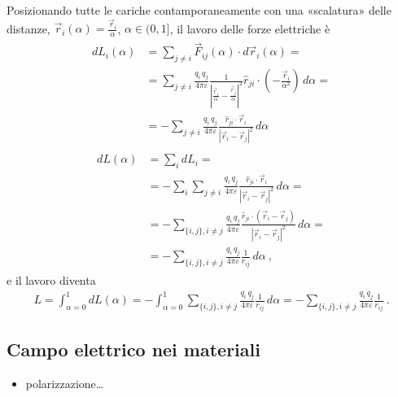 \documentclass[letterpaper,10pt,italian]{jupyterBook}
\begin{document}
\sphinxAtStartPar
Posizionando tutte le cariche contamporaneamente con una «scalatura» delle distanze, \(\vec{r}_i(\alpha) = \frac{\vec{r}_i}{\alpha}\), \(\alpha \in (0, 1]\), il lavoro delle forze elettriche è
\begin{equation*}
\begin{split}\begin{aligned}
  dL_i(\alpha) & = \sum_{j \ne i} \vec{F}_{ij}(\alpha) \cdot d \vec{r}_i(\alpha) = \\
  & = \sum_{j \ne i} \frac{q_i \, q_j}{4 \pi \varepsilon}  \frac{1}{\left| \frac{\vec{r}_i}{\alpha} - \frac{\vec{r}_j}{\alpha}\right|^2} \hat{r}_{ji} \cdot \left(-\frac{\vec{r}_i}{\alpha^2}\right) \, d \alpha = \\
  & = - \sum_{j \ne i} \frac{q_i \, q_j}{4 \pi \varepsilon}  \frac{\hat{r}_{ji} \cdot\vec{r}_i}{\left| \vec{r}_i - \vec{r}_j\right|^2}  \, d \alpha
\end{aligned}\end{split}
\end{equation*}\begin{equation*}
\begin{split}\begin{aligned}
 dL(\alpha) & = \sum_i d L_i = \\
  & = - \sum_{i} \sum_{j \ne i} \frac{q_i \, q_j}{4 \pi \varepsilon}  \frac{\hat{r}_{ji} \cdot\vec{r}_i}{\left| \vec{r}_i - \vec{r}_j\right|^2}  \, d \alpha = \\
  & = - \sum_{\{i,j\}, i \ne j} \frac{q_i \, q_j}{4 \pi \varepsilon}  \frac{\hat{r}_{ji} \cdot \left( \vec{r}_i - \vec{r}_j \right)}{\left| \vec{r}_i - \vec{r}_j\right|^2}  \, d \alpha = \\
  & = - \sum_{\{i,j\}, i \ne j} \frac{q_i \, q_j}{4 \pi \varepsilon}  \frac{1}{r_{ij}}  \, d \alpha  \ ,
\end{aligned}\end{split}
\end{equation*}
\sphinxAtStartPar
e il lavoro diventa
\begin{equation*}
\begin{split}
 L = \int_{\alpha = 0}^{1} dL (\alpha) =  - \int_{\alpha=0}^{1} \sum_{\{i,j\}, i \ne j} \frac{q_i \, q_j}{4 \pi \varepsilon}  \frac{1}{r_{ij}}  \, d \alpha = - \sum_{\{i,j\}, i \ne j} \frac{q_i \, q_j}{4 \pi \varepsilon}  \frac{1}{r_{ij}} \ .
\end{split}
\end{equation*}

\subsection{Campo elettrico nei materiali}
\label{\detokenize{ch/electromagnetism/electrostatics:campo-elettrico-nei-materiali}}\begin{itemize}
\item {} 
\sphinxAtStartPar
polarizzazione…

\end{itemize}
\end{document}

